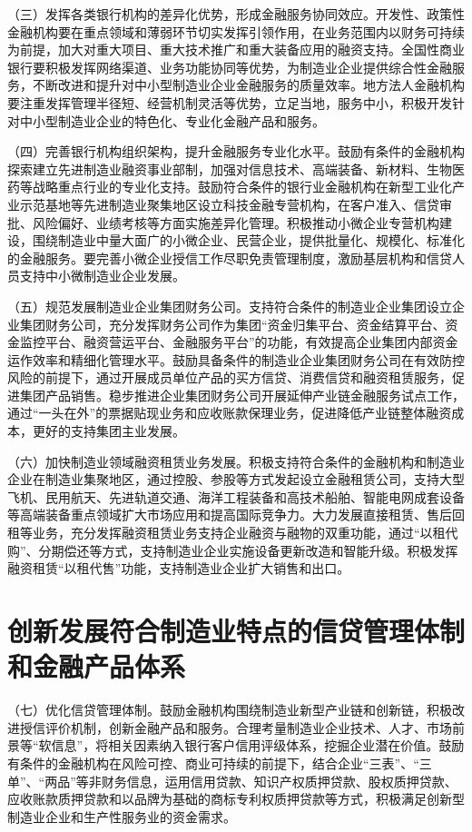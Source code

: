 （三）发挥各类银行机构的差异化优势，形成金融服务协同效应。开发性、政策性金融机构要在重点领域和薄弱环节切实发挥引领作用，在业务范围内以财务可持续为前提，加大对重大项目、重大技术推广和重大装备应用的融资支持。全国性商业银行要积极发挥网络渠道、业务功能协同等优势，为制造业企业提供综合性金融服务，不断改进和提升对中小型制造业企业金融服务的质量效率。地方法人金融机构要注重发挥管理半径短、经营机制灵活等优势，立足当地，服务中小，积极开发针对中小型制造业企业的特色化、专业化金融产品和服务。

（四）完善银行机构组织架构，提升金融服务专业化水平。鼓励有条件的金融机构探索建立先进制造业融资事业部制，加强对信息技术、高端装备、新材料、生物医药等战略重点行业的专业化支持。鼓励符合条件的银行业金融机构在新型工业化产业示范基地等先进制造业聚集地区设立科技金融专营机构，在客户准入、信贷审批、风险偏好、业绩考核等方面实施差异化管理。积极推动小微企业专营机构建设，围绕制造业中量大面广的小微企业、民营企业，提供批量化、规模化、标准化的金融服务。要完善小微企业授信工作尽职免责管理制度，激励基层机构和信贷人员支持中小微制造业企业发展。

（五）规范发展制造业企业集团财务公司。支持符合条件的制造业企业集团设立企业集团财务公司，充分发挥财务公司作为集团“资金归集平台、资金结算平台、资金监控平台、融资营运平台、金融服务平台”的功能，有效提高企业集团内部资金运作效率和精细化管理水平。鼓励具备条件的制造业企业集团财务公司在有效防控风险的前提下，通过开展成员单位产品的买方信贷、消费信贷和融资租赁服务，促进集团产品销售。稳步推进企业集团财务公司开展延伸产业链金融服务试点工作，通过“一头在外”的票据贴现业务和应收账款保理业务，促进降低产业链整体融资成本，更好的支持集团主业发展。

（六）加快制造业领域融资租赁业务发展。积极支持符合条件的金融机构和制造业企业在制造业集聚地区，通过控股、参股等方式发起设立金融租赁公司，支持大型飞机、民用航天、先进轨道交通、海洋工程装备和高技术船舶、智能电网成套设备等高端装备重点领域扩大市场应用和提高国际竞争力。大力发展直接租赁、售后回租等业务，充分发挥融资租赁业务支持企业融资与融物的双重功能，通过“以租代购”、分期偿还等方式，支持制造业企业实施设备更新改造和智能升级。积极发挥融资租赁“以租代售”功能，支持制造业企业扩大销售和出口。

\section{创新发展符合制造业特点的信贷管理体制和金融产品体系}

（七）优化信贷管理体制。鼓励金融机构围绕制造业新型产业链和创新链，积极改进授信评价机制，创新金融产品和服务。合理考量制造业企业技术、人才、市场前景等“软信息”，将相关因素纳入银行客户信用评级体系，挖掘企业潜在价值。鼓励有条件的金融机构在风险可控、商业可持续的前提下，结合企业“三表”、“三单”、“两品”等非财务信息，运用信用贷款、知识产权质押贷款、股权质押贷款、应收账款质押贷款和以品牌为基础的商标专利权质押贷款等方式，积极满足创新型制造业企业和生产性服务业的资金需求。


